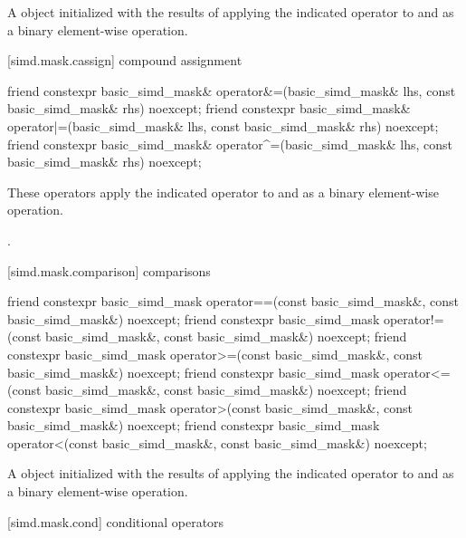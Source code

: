 \begin{itemdescr}
  \pnum\returns
  A  object initialized with the results of applying the indicated operator to  and  as a binary element-wise operation.
\end{itemdescr}

[simd.mask.cassign]{ compound assignment}

\begin{itemdecl}
friend constexpr basic_simd_mask&
  operator&=(basic_simd_mask& lhs, const basic_simd_mask& rhs) noexcept;
friend constexpr basic_simd_mask&
  operator|=(basic_simd_mask& lhs, const basic_simd_mask& rhs) noexcept;
friend constexpr basic_simd_mask&
  operator^=(basic_simd_mask& lhs, const basic_simd_mask& rhs) noexcept;
\end{itemdecl}

\begin{itemdescr}
  \pnum\effects
  These operators apply the indicated operator to  and  as a binary element-wise operation.

  \pnum\returns
  .
\end{itemdescr}

[simd.mask.comparison]{ comparisons}

\begin{itemdecl}
friend constexpr basic_simd_mask
  operator==(const basic_simd_mask&, const basic_simd_mask&) noexcept;
friend constexpr basic_simd_mask
  operator!=(const basic_simd_mask&, const basic_simd_mask&) noexcept;
friend constexpr basic_simd_mask
  operator>=(const basic_simd_mask&, const basic_simd_mask&) noexcept;
friend constexpr basic_simd_mask
  operator<=(const basic_simd_mask&, const basic_simd_mask&) noexcept;
friend constexpr basic_simd_mask
  operator>(const basic_simd_mask&, const basic_simd_mask&) noexcept;
friend constexpr basic_simd_mask
  operator<(const basic_simd_mask&, const basic_simd_mask&) noexcept;
\end{itemdecl}

\begin{itemdescr}
  \pnum\returns
  A  object initialized with the results of applying the indicated operator to  and  as a binary element-wise operation.
\end{itemdescr}

[simd.mask.cond]{ conditional operators}

